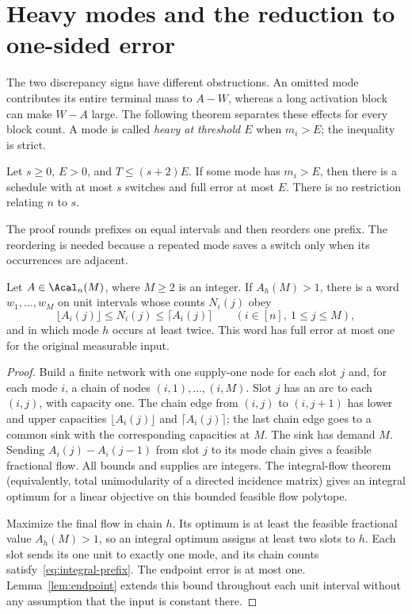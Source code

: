 \section{Heavy modes and the reduction to one-sided error}\label{sec:heavy}

The two discrepancy signs have different obstructions. An omitted mode
contributes its entire terminal mass to $A-W$, whereas a long activation
block can make $W-A$ large. The following theorem separates these effects
for every block count. A mode is called \emph{heavy at threshold $E$} when
$m_i>E$; the inequality is strict.

\begin{theorem}\label{thm:heavy}
Let $s\ge0$, $E>0$, and $T\le(s+2)E$. If some mode has $m_i>E$,
then there is a schedule with at most $s$ switches and full error at most $E$.
There is no restriction relating $n$ to $s$.
\end{theorem}

The proof rounds prefixes on equal intervals and then reorders one prefix.
The reordering is needed because a repeated mode saves a switch only when its
occurrences are adjacent.

\begin{lemma}\label{lem:prefix-repeat}
Let $A\in\Acal_n(M)$, where $M\ge2$ is an integer. If $A_h(M)>1$,
there is a word $w_1,\ldots,w_M$ on unit intervals whose counts $N_i(j)$ obey
\begin{equation}\label{eq:integral-prefix}
 \lfloor A_i(j)\rfloor\le N_i(j)\le\lceil A_i(j)\rceil
 \qquad(i\in[n],\ 1\le j\le M),
\end{equation}
and in which mode $h$ occurs at least twice. This word has full error at most
one for the original measurable input.
\end{lemma}
\begin{proof}
Build a finite network with one supply-one node for each slot $j$ and, for
each mode $i$, a chain of nodes $(i,1),\ldots,(i,M)$. Slot $j$ has an arc
to each $(i,j)$, with capacity one. The chain edge from $(i,j)$ to
$(i,j+1)$ has lower and upper capacities $\lfloor A_i(j)\rfloor$ and
$\lceil A_i(j)\rceil$; the last chain edge goes to a common sink with
the corresponding capacities at $M$. The sink has demand $M$. Sending
$A_i(j)-A_i(j-1)$ from slot $j$ to its mode chain gives a feasible
fractional flow. All bounds and supplies are integers. The integral-flow
theorem (equivalently, total unimodularity of a directed incidence matrix)
gives an integral optimum for a linear objective on this bounded feasible
flow polytope.

Maximize the final flow in chain $h$. Its optimum is at least the feasible
fractional value $A_h(M)>1$, so an integral optimum assigns at least two
slots to $h$. Each slot sends its one unit to exactly one mode, and its
chain counts satisfy~\eqref{eq:integral-prefix}. The endpoint error is at
most one. Lemma~\ref{lem:endpoint} extends this bound throughout each
unit interval without any assumption that the input is constant there.
\end{proof}


